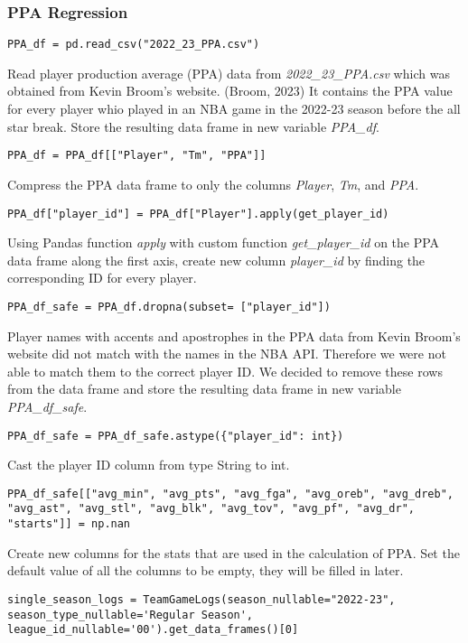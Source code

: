 \documentclass{article}
\begin{document}
\subsubsection{PPA Regression}
\begin{lstlisting}
PPA_df = pd.read_csv("2022_23_PPA.csv")
\end{lstlisting}
Read player production average (PPA) data from \textit{2022_23_PPA.csv} which was obtained from Kevin Broom's website. (Broom, 2023) It contains the PPA value for every player whio played in an NBA game in the 2022-23 season before the all star break. Store the resulting data frame in new variable \textit{PPA_df}.
\begin{lstlisting}
PPA_df = PPA_df[["Player", "Tm", "PPA"]]
\end{lstlisting}
Compress the PPA data frame to only the columns \textit{Player}, \textit{Tm}, and \textit{PPA}.
\begin{lstlisting}
PPA_df["player_id"] = PPA_df["Player"].apply(get_player_id)
\end{lstlisting}
Using Pandas function \textit{apply} with custom function \textit{get_player_id} on the PPA data frame along the first axis, create new column \textit{player_id} by finding the corresponding ID for every player.
\begin{lstlisting}
PPA_df_safe = PPA_df.dropna(subset= ["player_id"])
\end{lstlisting}
Player names with accents and  apostrophes in the PPA data from Kevin Broom's website did not match with the names in the NBA API. Therefore we were not able to match them to the correct player ID. We decided to remove these rows from the data frame and store the resulting data frame in new variable \textit{PPA_df_safe}.
\begin{lstlisting}
PPA_df_safe = PPA_df_safe.astype({"player_id": int})
\end{lstlisting}
Cast the player ID column from type String to int.
\begin{lstlisting}
PPA_df_safe[["avg_min", "avg_pts", "avg_fga", "avg_oreb", "avg_dreb", "avg_ast", "avg_stl", "avg_blk", "avg_tov", "avg_pf", "avg_dr", "starts"]] = np.nan
\end{lstlisting}
Create new columns for the stats that are used in the calculation of PPA. Set the default value of all the columns to be empty, they will be filled in later.
\begin{lstlisting}
single_season_logs = TeamGameLogs(season_nullable="2022-23", season_type_nullable='Regular Season', league_id_nullable='00').get_data_frames()[0]
\end{lstlisting}
\end{document}
